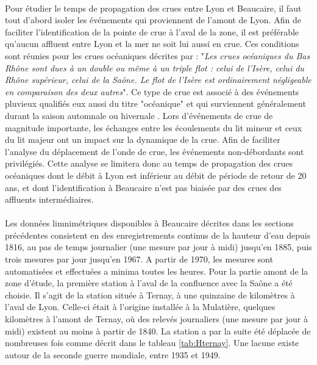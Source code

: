 \documentclass[11pt]{article}
\begin{document}
	\paragraph{} Pour étudier le temps de propagation des crues entre Lyon et Beaucaire, il faut tout d'abord isoler les événements qui proviennent de l'amont de Lyon. Afin de faciliter l'identification de la pointe de crue à l'aval de la zone, il est préférable qu'aucun affluent entre Lyon et la mer ne soit lui aussi en crue. Ces conditions sont réunies pour les crues océaniques décrites par \citet{parde_regime_1919} : "\textit{Les crues océaniques du Bas Rhône sont dues à un double ou même à un triple flot : celui de l'Isère, celui du Rhône supérieur, celui de la Saône. Le flot de l'Isère est ordinairement négligeable en comparaison des deux autres}". Ce type de crue est associé à des événements pluvieux qualifiés eux aussi du titre "océanique" et qui surviennent généralement durant la saison automnale ou hivernale \citep{parde_regime_1925}. Lors d'événements de crue de magnitude importante, les échanges entre les écoulements du lit mineur et ceux du lit majeur ont un impact sur la dynamique de la crue. Afin de faciliter l'analyse du déplacement de l'onde de crue, les événements non-débordants sont privilégiés. Cette analyse se limitera donc au temps de propagation des crues océaniques dont le débit à Lyon est inférieur au débit de période de retour de 20 ans, et dont l'identification à Beaucaire n'est pas biaisée par des crues des affluents intermédiaires. 
	
	\paragraph{} Les données limnimétriques disponibles à Beaucaire décrites dans les sections précédentes consistent en des enregistrements continus de la hauteur d'eau depuis 1816, au pas de temps journalier (une mesure par jour à midi) jusqu'en 1885, puis trois mesures par jour jusqu'en 1967. A partir de 1970, les mesures sont automatisées et effectuées a minima toutes les heures. Pour la partie amont de la zone d'étude, la première station à l'aval de la confluence avec la Saône a été choisie. Il s'agit de la station située à Ternay, à une quinzaine de kilomètres à l'aval de Lyon. Celle-ci était à l'origine installée à la Mulatière, quelques kilomètres à l'amont de Ternay, où des relevés journaliers (une mesure par jour à midi) existent au moins à partir de 1840. La station a par la suite été déplacée de nombreuses fois comme décrit dans le tableau \ref{tab:Hternay}. Une lacune existe autour de la seconde guerre mondiale, entre 1935 et 1949. 
	
\end{document}
